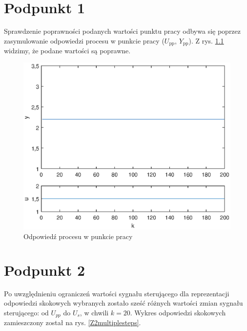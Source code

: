 \chapter{Podpunkt 1}
Sprawdzenie poprawności podanych wartości punktu pracy odbywa się poprzez zasymulowanie odpowiedzi procesu w punkcie pracy ($U_{\mathrm{pp}}$, $Y_{\mathrm{pp}}$). Z rys. \ref{Z1} widzimy, że podane wartości są poprawne.

\begin{figure}[ht]
\centering
\includegraphics[scale=1]{images/Z1}
\caption{Odpowiedź procesu w punkcie pracy}
\label{Z1}
\end{figure}


\chapter{Podpunkt 2}
Po uwzględnieniu ograniczeń wartości sygnału sterującego dla reprezentacji odpowiedzi skokowych wybranych zostało sześć różnych wartości zmian sygnału sterującego: od $U_{pp}$ do $U_s$, w chwili $k=20$. Wykres odpowiedzi skokowych zamieszczony został na rys. \ref{Z2multiplesteps}.

